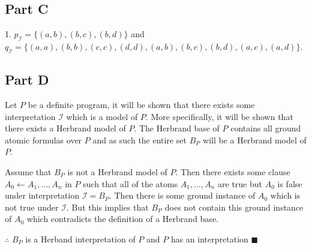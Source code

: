 \documentclass[11pt, oneside]{article}   	%
\begin{document}
\subsection{Part C}
1. $p_\mathscr{I} = \{(a, b), (b, c), (b, d)\}$ and $q_\mathscr{I} = \{(a, a), (b, b), (c, c), (d, d), (a, b), (b, c), (b, d), (a, c), (a, d)\}$.

\subsection{Part D}
Let $P$ be a definite program, it will be shown that there exists some interpretation $\mathscr{I}$ which is a model of $P$.  More specifically, it will be shown that there exists a Herbrand model of $P$.  The Herbrand base of $P$ contains all ground atomic formulas over $P$ and as such the entire set $B_P$ will be a Herbrand model of $P$.

Assume that $B_P$ is not a Herbrand model of $P$.  Then there exists some clause $A_0 \leftarrow A_1, ..., A_n$ in $P$ such that all of the atoms $A_1, ..., A_n$ are true but $A_0$ is false under interpretation $\mathscr{I} = B_P$.  Then there is some ground instance of $A_0$ which is not true under $\mathscr{I}$.  But this implies that $B_P$ does not contain this ground instance of $A_0$ which contradicts the definition of a Herbrand base.

$\therefore$ $B_P$ is a Herband interpretation of $P$ and $P$ has an interpretation $\blacksquare$
\end{document}
